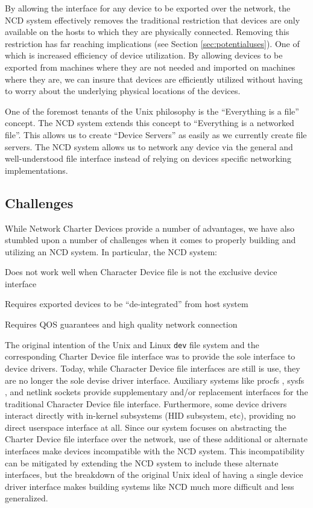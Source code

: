 \documentclass[11pt,twocolumn]{article}
\newenvironment{packed_item}{
\begin{itemize}
  \setlength{\itemsep}{1pt}
  \setlength{\parskip}{0pt}
  \setlength{\parsep}{0pt}
}{\end{itemize}}
\begin{document}
By allowing the interface for any device to be exported over the
network, the NCD system effectively removes the traditional restriction
that devices are only available on the hosts to which they are
physically connected. Removing this restriction has far reaching
implications (see Section \ref{sec:potentialuses}). One of which is
increased efficiency of device utilization. By allowing devices to
be exported from machines where they are not needed and imported on
machines where they are, we can insure that devices are efficiently
utilized without having to worry about the underlying physical locations
of the devices.

One of the foremost tenants of the Unix philosophy is the ``Everything
is a file'' concept. The NCD system extends this concept to
``Everything is a networked file''. This allows us to create ``Device
Servers'' as easily as we currently create file servers. The NCD
system allows us to network any device via the general and
well-understood file interface instead of relying on devices specific
networking implementations.

\subsection{Challenges}
\label{sec:challenges}

While Network Charter Devices provide a number of advantages, we have
also stumbled upon a number of challenges when it comes to properly
building and utilizing an NCD system. In particular, the NCD system:

\begin{packed_item}
\item Does not work well when Character Device file is not the exclusive
  device interface
\item Requires exported devices to be ``de-integrated'' from host system
\item Requires QOS guarantees and high quality network connection
\end{packed_item}

The original intention of the Unix and Linux \texttt{dev} file
system and the corresponding Charter Device file interface was to
provide the sole interface to device drivers. Today, while Character
Device file interfaces are still is use, they are no longer the sole
devise driver interface. Auxiliary systems like procfs
\cite{interfaces}, sysfs \cite{sysfs-mochel}, and netlink sockets
\cite{netlink-ayuso} provide supplementary and/or replacement interfaces
for the traditional Character Device file interface. Furthermore, some
device drivers interact directly with in-kernel subsystems (HID subsystem,
etc), providing no direct userspace interface at all. Since our system
focuses on abstracting the Charter Device file interface over the
network, use of these additional or alternate interfaces make devices
incompatible with the NCD system. This incompatibility can be mitigated
by extending the NCD system to include these alternate interfaces, but the
breakdown of the original Unix ideal of having a single device driver
interface makes building systems like NCD much more difficult and less
generalized.
\end{document}
